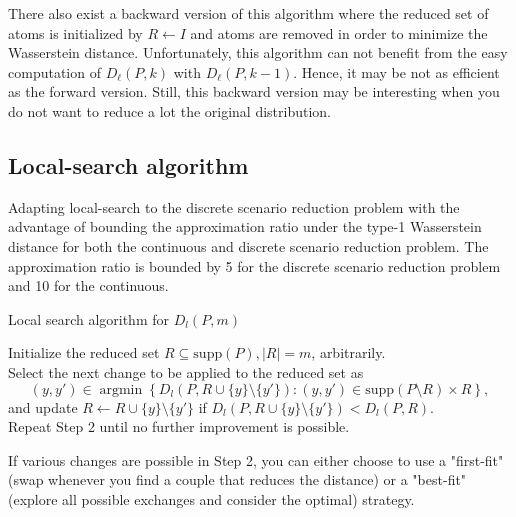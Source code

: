 \documentclass{amsart}
\newcommand{\argmin}{\mathop{\arg\min}}
\begin{document}
There also exist a backward version of this algorithm where the reduced set of atoms is initialized by $R\gets I$ and atoms are removed in order to minimize the Wasserstein distance. Unfortunately, this algorithm can not benefit from the easy computation of $D_\ell\left(P,k\right)$ with $D_\ell\left(P,k-1\right)$. Hence, it may be not as efficient as the forward version. Still, this backward version may be interesting when you do not want to reduce a lot the original distribution.
\subsection{Local-search algorithm}\label{guarant}
Adapting local-search to the discrete scenario reduction problem with the advantage of bounding the approximation ratio under the type-1 Wasserstein distance for both the continuous and discrete scenario reduction problem. The approximation ratio is bounded by 5 for the discrete scenario reduction problem and 10 for the continuous.
\begin{algorithm}
    \caption{Local search algorithm for $D_l\left(P,m\right)$}\label{Local search}
    Initialize the reduced set $R\subseteq \text{supp}\left(P\right), \lvert R\rvert = m$, arbitrarily. \\ Select the next change to be applied to the reduced set as 
    $$
    \left(y,y'\right)\in\argmin\left\{D_l\left(P,R\cup\{y\}\setminus \{y'\}\right) : \left(y,y'\right)\in\text{supp}\left(P\setminus R\right)\times R\right\},
    $$
    and update $R\gets R\cup \{y\}\setminus \{y'\}$ if $D_l\left(P, R\cup\{y\}\setminus \{y'\} \right)<D_l\left(P,R\right).$ \\ Repeat Step 2 until no further improvement is possible.
\end{algorithm}

If various changes are possible in Step 2, you can either choose to use a "first-fit" (swap whenever you find a couple that reduces the distance) or a "best-fit" (explore all possible exchanges and consider the optimal) strategy.
\end{document}
